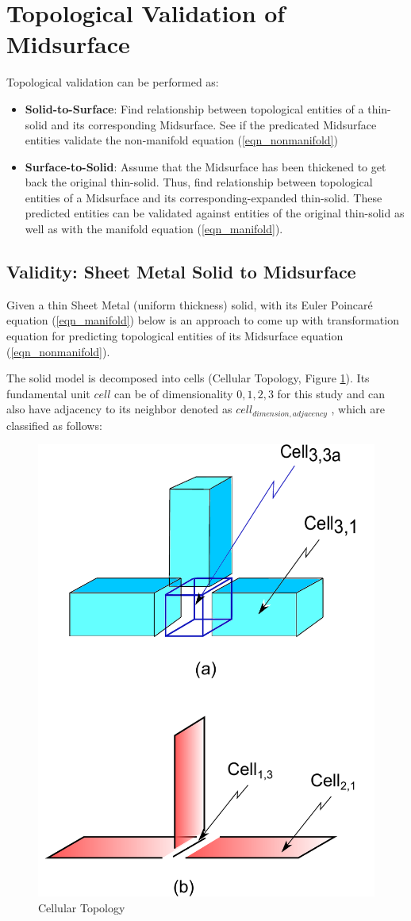 \section{Topological Validation of Midsurface}

Topological validation can be performed as:
\begin{itemize}
[noitemsep,topsep=2pt,parsep=2pt,partopsep=2pt,leftmargin=*]
\item \textbf{Solid-to-Surface}: Find relationship between topological entities of a thin-solid and its corresponding Midsurface. See if the predicated Midsurface entities validate the non-manifold equation (\ref{eqn_nonmanifold})
\item  \textbf{Surface-to-Solid}: Assume that the Midsurface has been thickened to get back the original thin-solid. Thus, find relationship between topological entities of a Midsurface and its corresponding-expanded thin-solid. These predicted entities can be validated against entities of the original thin-solid as well as with the manifold equation (\ref{eqn_manifold}).
\end{itemize}


\subsection{Validity: Sheet Metal Solid to Midsurface}

Given a thin Sheet Metal (uniform thickness) solid, with its Euler Poincar\'e equation (\ref{eqn_manifold}) below is an approach to come up with transformation equation for predicting topological entities of its Midsurface equation (\ref{eqn_nonmanifold}).

The solid model is decomposed into cells (Cellular Topology, Figure \ref{fig_cellular}). Its  fundamental unit $cell$ can be of dimensionality $0,1,2,3$ for this study and can also have adjacency to its neighbor denoted as $cell_{dimension,adjacency}$ , which are classified as follows:

\begin{figure}[htbp]
\centering \includegraphics[width=0.34\linewidth]{../Common/images/Cellular_Topology.pdf} 
\caption{Cellular Topology}
\label{fig_cellular}
\end{figure}


